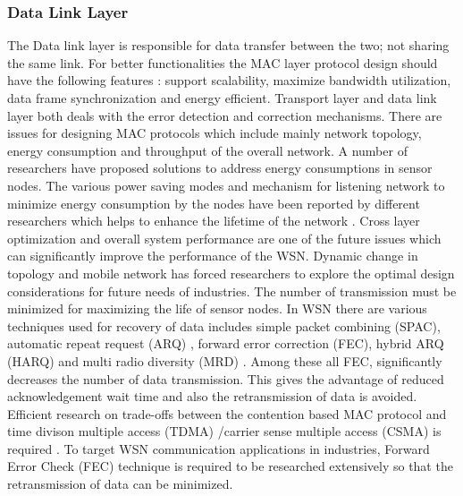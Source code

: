 \documentclass[12pt,journal,communications surveys and tutorials]{IEEEtran}
\begin{document}
\subsubsection{Data Link Layer}
The Data link layer is responsible for data transfer between the two; not sharing the same link. For better functionalities the MAC layer protocol design should have the following features \cite{akyildiz2002survey,yick2008wireless}: support scalability, maximize bandwidth utilization, data frame synchronization and energy efficient. Transport layer and data link layer both deals with the error detection and correction mechanisms. There are issues for designing MAC protocols which include mainly network topology, energy consumption and throughput of the overall network.  A number of researchers have proposed solutions to address energy consumptions in sensor nodes. The various power saving modes and mechanism for listening network to minimize energy consumption by the nodes have been reported by different researchers which helps to enhance the lifetime of the network \cite{guo2001low,mishra2004adaptive,rajendran2006energy}. Cross layer optimization and overall system performance are one of the future issues which can significantly improve the performance of the WSN. Dynamic change in topology and mobile network has forced researchers to explore the optimal design considerations for future needs of industries. The number of transmission must be minimized for maximizing the life of sensor nodes. In WSN there are various techniques used for recovery of data includes simple packet combining (SPAC)\cite{dubois2005packet}, automatic repeat request (ARQ) \cite{ganti2006datalink}, forward error correction (FEC)\cite{blahut1983theory}, hybrid ARQ (HARQ) \cite{liu1997error} and multi radio diversity (MRD) \cite{miu2005improving}. Among these all FEC, significantly decreases the number of data transmission. This gives the advantage of reduced acknowledgement wait time and also the retransmission of data is avoided. Efficient research on trade-offs between the contention based MAC protocol and time divison multiple access (TDMA) /carrier sense multiple access (CSMA) is required \cite{yick2008wireless}. To target WSN communication applications in industries, Forward Error Check (FEC) technique is required to be researched extensively so that the retransmission of data can be minimized.
\end{document}

